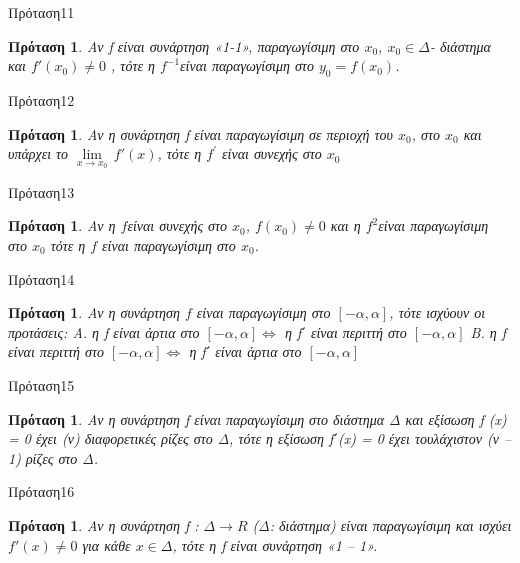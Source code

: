 \documentclass[greek]{beamer}
\newtheorem{proposition}[theorem]{Πρόταση}
\begin{document}
\begin{frame}{Πρόταση11}
 \begin{proposition}
  \normalfont Αν f είναι συνάρτηση «1-1», παραγωγίσιμη στο ${{x}_{0}}$, ${{x}_{0}}\in \Delta $- διάστημα και ${f}'({{x}_{0}})\ne 0$ , τότε η ${{f}^{-1}}$είναι παραγωγίσιμη στο ${{y}_{0}}=f({{x}_{0}})$.
 \end{proposition}
\end{frame}

\begin{frame}{Πρόταση12}
 \begin{proposition}
  \normalfont Αν η συνάρτηση f είναι παραγωγίσιμη σε περιοχή του ${{x}_{0}}$, στο ${{x}_{0}}$ και υπάρχει το $\underset{x\to {{x}_{0}}}{\mathop{\lim }}\,{f}'(x)$, τότε η ${{f}^{'}}$ είναι συνεχής στο ${{x}_{0}}$
 \end{proposition}
\end{frame}

\begin{frame}{Πρόταση13}
 \begin{proposition}
  \normalfont Αν η $f$είναι συνεχής στο ${{x}_{0}}$, $f({{x}_{0}})\ne 0$ και η ${{f}^{2}}$είναι παραγωγίσιμη στο ${{x}_{0}}$ τότε η $f$ είναι παραγωγίσιμη στο ${{x}_{0}}$.
 \end{proposition}
\end{frame}

\begin{frame}{Πρόταση14}
 \begin{proposition}
  \normalfont Αν η συνάρτηση $f$ είναι παραγωγίσιμη στο $[-α, α]$, τότε ισχύουν οι προτάσεις:
  Α. η f είναι άρτια στο $[-α, α] \Leftrightarrow $ η f΄ είναι περιττή στο $[-α, α]$
  Β. η f είναι περιττή στο $[-α, α] \Leftrightarrow $ η f΄ είναι άρτια στο $[-α, α]$
 \end{proposition}
\end{frame}

\begin{frame}{Πρόταση15}
 \begin{proposition}
  \normalfont Αν η συνάρτηση f είναι παραγωγίσιμη στο διάστημα Δ και εξίσωση f (x) = 0 έχει (ν) διαφορετικές ρίζες στο Δ, τότε η εξίσωση f΄(x) = 0 έχει τουλάχιστον (ν – 1) ρίζες στο Δ.
 \end{proposition}
\end{frame}

\begin{frame}{Πρόταση16}
 \begin{proposition}
  \normalfont Αν η συνάρτηση f : $\Delta \to R$ (Δ: διάστημα) είναι παραγωγίσιμη και ισχύει ${f}'(x)\ne 0$ για κάθε $x\in \Delta $, τότε η f είναι συνάρτηση «1 – 1».
 \end{proposition}
\end{frame}
\end{document}
